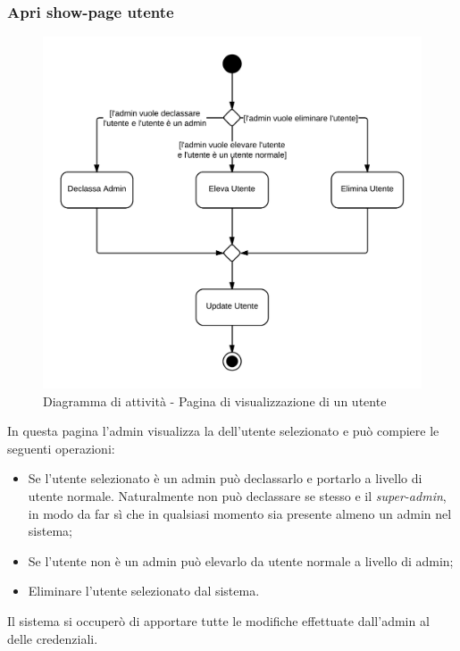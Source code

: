 \subsubsection{Apri show-page utente}

\begin{figure}[H]
\centering
\includegraphics[scale=0.2]{uml/attivita/MaaP - Apri show-page utente.png}
\caption{Diagramma di attività - Pagina di visualizzazione di un utente}
\end{figure}

In questa pagina l'admin visualizza la  dell'utente selezionato e può compiere le seguenti operazioni:

\begin{itemize}

	\item Se l'utente selezionato è un admin può declassarlo e portarlo a livello di utente normale. Naturalmente non può declassare se stesso e il \textit{super-admin}, in modo da far sì che in qualsiasi momento sia presente almeno un admin nel sistema;
	\item Se l'utente non è un admin può elevarlo da utente normale a livello di admin;
	\item Eliminare l'utente selezionato dal sistema.

\end{itemize}

Il sistema  si occuperò di apportare tutte le modifiche effettuate dall'admin al  delle credenziali.

